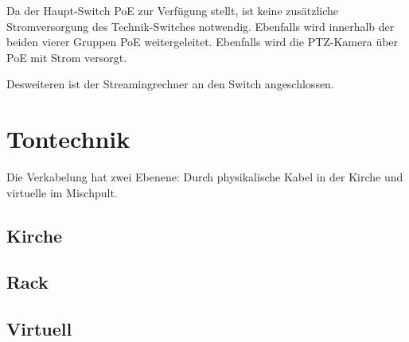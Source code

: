 		Da der Haupt-Switch \Gls{PoE} zur Verfügung stellt, ist keine zusätzliche Stromversorgung des Technik-Switches notwendig.
		Ebenfalls wird innerhalb der beiden vierer Gruppen \Gls{PoE} weitergeleitet.
		Ebenfalls wird die \Gls{PTZ-Kamera} über \Gls{PoE} mit Strom versorgt.

		Desweiteren ist der Streamingrechner an den Switch angeschlossen.

	\section{Tontechnik}
		Die Verkabelung hat zwei Ebenene: Durch physikalische Kabel in der Kirche und virtuelle  im Mischpult.
		\subsection{Kirche}
		\subsection{Rack}
		\subsection{Virtuell}
		